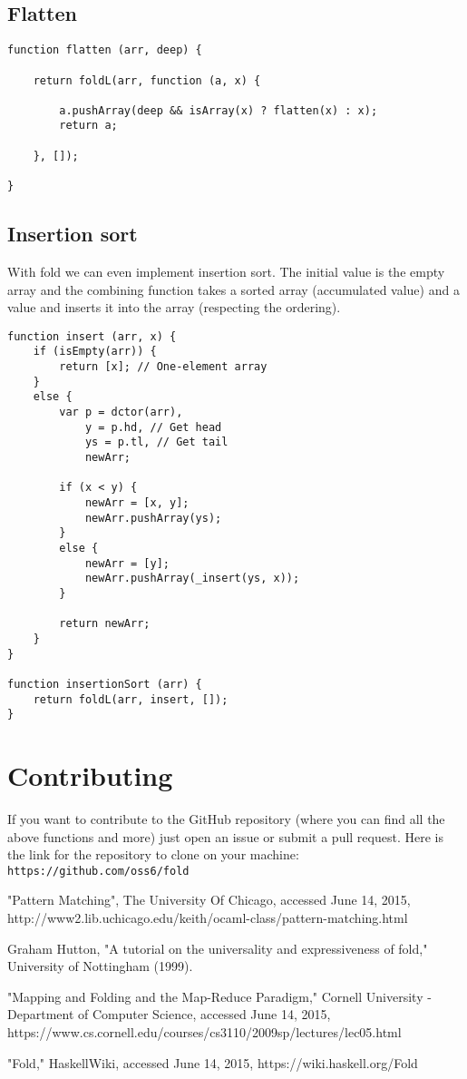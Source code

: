 \documentclass[12pt]{article}
\begin{document}
\subsection*{Flatten}
\medskip
\begin{lstlisting}
function flatten (arr, deep) {

	return foldL(arr, function (a, x) {
	
		a.pushArray(deep && isArray(x) ? flatten(x) : x);
		return a;
		
	}, []);
	
}
\end{lstlisting}

\subsection*{Insertion sort}
With fold we can even implement insertion sort.
The initial value is the empty array and the combining function takes a sorted array
(accumulated value) and a value and inserts it into the array (respecting the ordering).

\medskip
\begin{lstlisting}
function insert (arr, x) {
	if (isEmpty(arr)) {
		return [x]; // One-element array
	}
	else {
		var p = dctor(arr),
			y = p.hd, // Get head
			ys = p.tl, // Get tail
			newArr;
			
		if (x < y) {
			newArr = [x, y];
			newArr.pushArray(ys);
		}
		else {
			newArr = [y];
			newArr.pushArray(_insert(ys, x));
		}
		
		return newArr;
	}
}

function insertionSort (arr) {
	return foldL(arr, insert, []);
}
\end{lstlisting}

\newpage

\section*{Contributing}
If you want to contribute to the GitHub repository (where you can find all the above functions and more)
just open an issue or submit a pull request. Here is the link for the repository to clone on
your machine: \verb|https://github.com/oss6/fold|

\begin{thebibliography}{9}
  	"Pattern Matching",
  	The University Of Chicago,
  	accessed June 14, 2015,
  	http://www2.lib.uchicago.edu/keith/ocaml-class/pattern-matching.html
  	
  	Graham Hutton,
  	"A tutorial on the universality and expressiveness of fold,"
  	University of Nottingham
  	(1999).
  	
  	"Mapping and Folding and the Map-Reduce Paradigm,"
  	Cornell University - Department of Computer Science,
  	accessed June 14, 2015,
  	https://www.cs.cornell.edu/courses/cs3110/2009sp/lectures/lec05.html
  	
  	"Fold,"
  	HaskellWiki,
  	accessed June 14, 2015,
  	https://wiki.haskell.org/Fold
\end{thebibliography}
\end{document}
